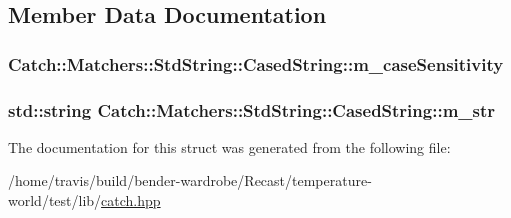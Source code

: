 \subsection{Member Data Documentation}
\hypertarget{struct_catch_1_1_matchers_1_1_std_string_1_1_cased_string_ae1c2864c986941536a6e94cca0528f92}{
\subsubsection[{m\-\_\-case\-Sensitivity}]{ Catch\-::\-Matchers\-::\-Std\-String\-::\-Cased\-String\-::m\-\_\-case\-Sensitivity}}\label{struct_catch_1_1_matchers_1_1_std_string_1_1_cased_string_ae1c2864c986941536a6e94cca0528f92}
\hypertarget{struct_catch_1_1_matchers_1_1_std_string_1_1_cased_string_ad05dbc99aba3c3c386d6b856b213f911}{
\subsubsection[{m\-\_\-str}]{\setlength{\rightskip}{0pt plus 5cm}std\-::string Catch\-::\-Matchers\-::\-Std\-String\-::\-Cased\-String\-::m\-\_\-str}}\label{struct_catch_1_1_matchers_1_1_std_string_1_1_cased_string_ad05dbc99aba3c3c386d6b856b213f911}


The documentation for this struct was generated from the following file\-:\begin{DoxyCompactItemize}
\item 
/home/travis/build/bender-\/wardrobe/\-Recast/temperature-\/world/test/lib/\hyperlink{catch_8hpp}{catch.\-hpp}\end{DoxyCompactItemize}
